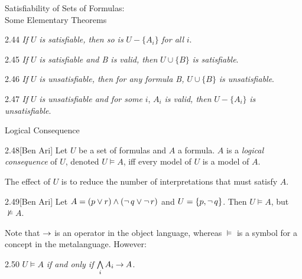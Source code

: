 \begin{wideslide}[bm=,toc=]{Satisfiability of Sets of Formulas:\\ Some Elementary
Theorems}
\begin{thm}{2.44}
{ \em If} $U$ {\em is satisfiable, then so is} $U - \{A_i\}$ {\em for all} $i$. 
\end{thm}
\begin{thm}{2.45}
{ \em If} $U$ {\em is satisfiable and B is valid, then} $U \cup \{B\}$ {\em is
  satisfiable}. 
\end{thm}
\begin{thm}{2.46}
{ \em If} $U$ {\em is unsatisfiable, then for any formula B,} $U \cup \{B\}$ {\em is
  unsatisfiable}. 
\end{thm}
\begin{thm}{2.47}
{ \em If} $U$ {\em is unsatisfiable and for some } $i$, $A_i$ { \em is valid,
  then} $U - \{A_i\}$ {\em is unsatisfiable}. 
\end{thm}
\end{wideslide}

\begin{wideslide}[bm=,toc=]{Logical Consequence}
\begin{defn}{2.48}[Ben Ari]
Let $U$ be a set of formulas and $A$ a formula. $A$ is a \emph{logical
  consequence} of $U$, denoted $U \models A$, iff every model of $U$ is a
  model of $A$.
\end{defn}
The effect of $U$ is to reduce the number of interpretations that must satisfy
$A$.
\begin{ex}{2.49}[Ben Ari]
Let $A = (p \lor r) \land (\mathop{\neg} q \lor \mathop{\neg} r)$ and $U = \{p,\mathop{\neg} q\}$.
Then $U \models A$, but $\not\models A$.
\end{ex}
Note that $\mathbin{\rightarrow}$ is an operator in the object language, whereas $\models$
is a symbol for a concept in the metalanguage. However:
\begin{thm}{2.50}
$U \models A$ \emph{if and only if } $\bigwedge\limits_{i} A_i \mathbin{\rightarrow} A$. 
\end{thm}
\end{wideslide}

